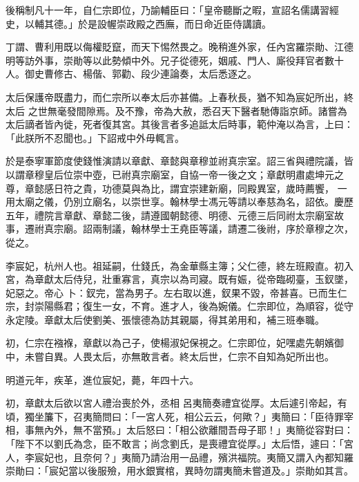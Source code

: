\begin{pinyinscope}
 後稱制凡十一年，自仁宗即位，乃諭輔臣曰：「皇帝聽斷之暇，宣詔名儒講習經史，以輔其德。」於是設幄崇政殿之西廡，而日命近臣侍講讀。



 丁謂、曹利用既以侮權貶竄，而天下惕然畏之。晚稍進外家，任內宮羅崇勛、江德明等訪外事，崇勛等以此勢傾中外。兄子從德死，姻戚、門人、廝役拜官者數十人。御史曹修古、楊偕、郭勸、段少連論奏，太后悉逐之。



 太后保護帝既盡力，而仁宗所以奉太后亦甚備。上春秋長，猶不知為宸妃所出，終太后
 之世無毫發間隙焉。及不豫，帝為大赦，悉召天下醫者馳傳詣京師。諸嘗為太后謫者皆內徙，死者復其宮。其後言者多追詆太后時事，範仲淹以為言，上曰：「此朕所不忍聞也。」下詔戒中外毋輒言。



 於是泰寧軍節度使錢惟演請以章獻、章懿與章穆並祔真宗室。詔三省與禮院議，皆以謂章穆皇后位崇中壺，已祔真宗廟室，自協一帝一後之文；章獻明肅處坤元之尊，章懿感日符之貴，功德莫與為比，謂宜崇建新廟，同殿異室，歲時薦饗，
 一用太廟之儀，仍別立廟名，以崇世享。翰林學士馮元等請以奉慈為名，詔依。慶歷五年，禮院言章獻、章懿二後，請遵國朝懿德、明德、元德三后同祔太宗廟室故事，遷祔真宗廟。詔兩制議，翰林學士王堯臣等議，請遷二後祔，序於章穆之次，從之。



 李宸妃，杭州人也。祖延嗣，仕錢氏，為金華縣主簿；父仁德，終左班殿直。初入宮，為章獻太后侍兒，壯重寡言，真宗以為司寢。既有娠，從帝臨砌臺，玉釵墜，妃惡之。帝心
 卜：釵完，當為男子。左右取以進，釵果不毀，帝甚喜。已而生仁宗，封崇陽縣君；復生一女，不育。進才人，後為婉儀。仁宗即位，為順容，從守永定陵。章獻太后使劉美、張懷德為訪其親屬，得其弟用和，補三班奉職。



 初，仁宗在襁褓，章獻以為己子，使楊淑妃保視之。仁宗即位，妃嘿處先朝嬪御中，未嘗自異。人畏太后，亦無敢言者。終太后世，仁宗不自知為妃所出也。



 明道元年，疾革，進位宸妃，薨，年四十六。



 初，章獻太后欲以宮人禮治喪於外，丞相
 呂夷簡奏禮宜從厚。太后遽引帝起，有頃，獨坐簾下，召夷簡問曰：「一宮人死，相公云云，何歟？」夷簡曰：「臣待罪宰相，事無內外，無不當預。」太后怒曰：「相公欲離間吾母子耶！」夷簡從容對曰：「陛下不以劉氏為念，臣不敢言；尚念劉氏，是喪禮宜從厚。」太后悟，遽曰：「宮人，李宸妃也，且奈何？」夷簡乃請治用一品禮，殯洪福院。夷簡又謂入內都知羅崇勛曰：「宸妃當以後服殮，用水銀實棺，異時勿謂夷簡未嘗道及。」崇勛如其言。




\end{pinyinscope}
